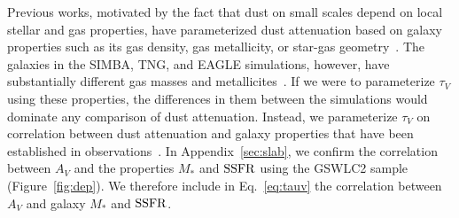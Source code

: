 Previous works, motivated by the fact that dust on small scales depend on
local stellar and gas properties, have parameterized dust attenuation based
on galaxy properties such as its gas density, gas metallicity, or star-gas
geometry~\citep[\eg][]{somerville1999, somerville2012, steinacker2013,
camps2015, narayanan2018, trayford2020, vogelsberger2020}. 
The galaxies in the SIMBA, TNG, and EAGLE simulations, however, have
substantially different gas masses and metallicites~\citep[][Maller \etal~in prep.]{dave2020}.  
If we were to parameterize $\tau_V$ using these properties, the differences
in them between the simulations would dominate any comparison of dust attenuation.
Instead, we parameterize $\tau_V$ on correlation between dust attenuation
and galaxy properties that have been established in observations~\citep[\eg~][]{garn2010, battisti2016, salim2020}.
In Appendix~\ref{sec:slab}, we confirm the correlation between $A_V$ and
the properties $M_*$ and ${\rm SSFR}$ using the \cite{salim2018} GSWLC2 sample
(Figure~\ref{fig:dep}). 
We therefore include in Eq.~\ref{eq:tauv} the correlation between $A_V$ and
galaxy $M_*$ and ${\rm SSFR}$.



